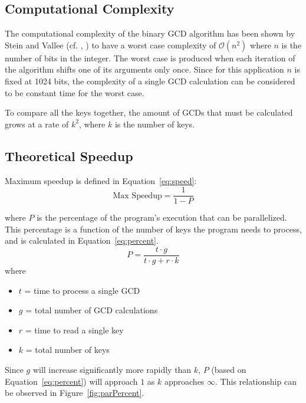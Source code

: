 \documentclass[smallextended]{svjour3}       %
\begin{document}
\subsection{Computational Complexity}
\label{subsec:compcomp}
The computational complexity of the binary GCD algorithm has been shown by 
Stein and Vall$\acute{\text{e}}$e (cf. \cite{stein1967computational}, 
\cite{vallee1998complete}) to have a worst case complexity of $\mathcal{O}(n^2)$ 
where $n$ is the number of bits in the integer. The worst case is produced 
when each iteration of the algorithm shifts one of its arguments only once. 
Since for this application $n$ is fixed at 1024 bits, the complexity of a 
single GCD calculation can be considered to be constant time for the worst case.

To compare all the keys together, the amount of GCDs that must be calculated 
grows at a rate of $k^2$, where $k$ is the number of keys.

\subsection{Theoretical Speedup}
\label{subsec:theory}
Maximum speedup is defined in Equation~\ref{eq:speed}:
\begin{equation}
   \mbox{Max Speedup} = \frac{1}{1 - P}
   \label{eq:speed}
\end{equation}

where $P$ is the percentage of the program's execution that can be parallelized.
This percentage is a function of the number of keys the program needs to 
process, and is calculated in Equation~\ref{eq:percent}.
\begin{equation}
P = \frac{t \cdot g}{t \cdot g + r \cdot k}
   \label{eq:percent}
\end{equation}
where
\begin{itemize}
   \item $t$ = time to process a single GCD
   \item $g$ = total number of GCD calculations
   \item $r$ = time to read a single key
   \item $k$ = total number of keys
\end{itemize}

Since $g$ will increase significantly more rapidly than $k$, $P$ (based on 
Equation~\ref{eq:percent}) will approach $1$ as $k$ approaches 
$\infty$. This relationship can be observed in Figure~\ref{fig:parPercent}.
\end{document}
